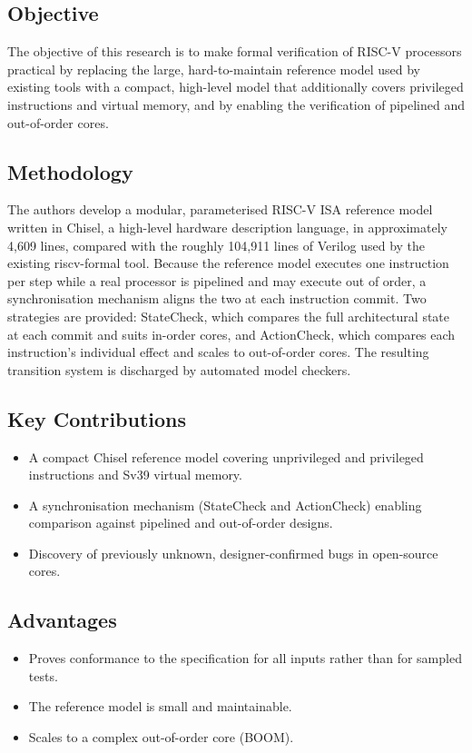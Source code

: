 \documentclass[12pt,a4paper]{report}
\begin{document}
\subsection{Objective}
The objective of this research is to make formal verification of RISC-V processors
practical by replacing the large, hard-to-maintain reference model used by existing tools
with a compact, high-level model that additionally covers privileged instructions and
virtual memory, and by enabling the verification of pipelined and out-of-order cores.

\subsection{Methodology}
The authors develop a modular, parameterised RISC-V ISA reference model written in Chisel,
a high-level hardware description language, in approximately 4{,}609 lines, compared with
the roughly 104{,}911 lines of Verilog used by the existing riscv-formal tool. Because the
reference model executes one instruction per step while a real processor is pipelined and
may execute out of order, a synchronisation mechanism aligns the two at each instruction
commit. Two strategies are provided: StateCheck, which compares the full architectural
state at each commit and suits in-order cores, and ActionCheck, which compares each
instruction's individual effect and scales to out-of-order cores. The resulting transition
system is discharged by automated model checkers.

\subsection{Key Contributions}
\begin{itemize}[nosep]
  \item A compact Chisel reference model covering unprivileged and privileged
        instructions and Sv39 virtual memory.
  \item A synchronisation mechanism (StateCheck and ActionCheck) enabling comparison
        against pipelined and out-of-order designs.
  \item Discovery of previously unknown, designer-confirmed bugs in open-source cores.
\end{itemize}

\subsection{Advantages}
\begin{itemize}[nosep]
  \item Proves conformance to the specification for all inputs rather than for
        sampled tests.
  \item The reference model is small and maintainable.
  \item Scales to a complex out-of-order core (BOOM).
\end{itemize}
\end{document}
